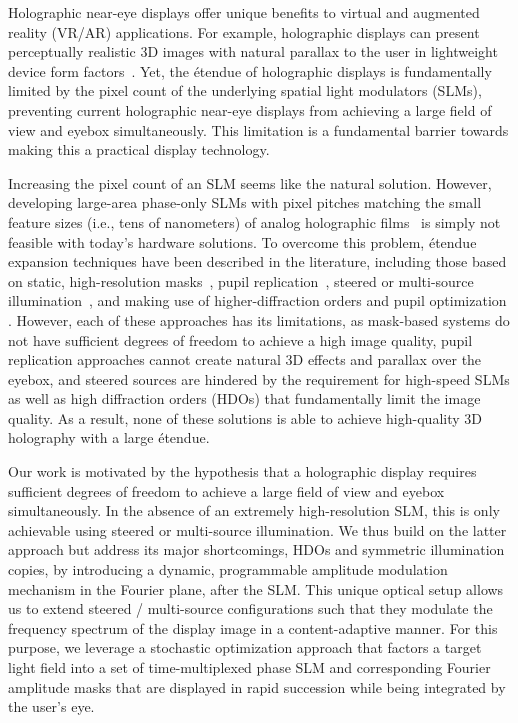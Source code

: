 
Holographic near-eye displays offer unique benefits to virtual and augmented reality (VR/AR) applications. For example, holographic displays can present perceptually realistic 3D images with natural parallax to the user in lightweight device form factors~\cite{maimone2017holo,Kim2022-cd, gopakumar2024ar,jang2024waveguide}. Yet, the \'etendue of holographic displays is fundamentally limited by the pixel count of the underlying spatial light modulators (SLMs), preventing current holographic near-eye displays from achieving a large field of view and eyebox simultaneously. This limitation is a fundamental barrier towards making this a practical display technology. 


Increasing the pixel count of an SLM seems like the natural solution. However, developing large-area phase-only SLMs with pixel pitches matching the small feature sizes (i.e., tens of nanometers) of analog holographic films~\cite{benton2008holographic} is simply not feasible with today's hardware solutions. To overcome this problem, \'etendue expansion techniques have been described in the literature, including those based on static, high-resolution masks~\cite{kuo2020mask, park2019photon,yu2017speckle, buckley2006mask,monin2022mask,tseng2023neural}, pupil replication~\cite{kress2020waveguide}, steered or multi-source illumination~\cite{jang2018hoe,lee2020wide,jo2022binary,lee2022envelope, monin2022tilt}, and making use of higher-diffraction orders and pupil optimization \cite{shi2024ergo, schiffers2023stochastic}. However, each of these approaches has its limitations, as mask-based systems do not have sufficient degrees of freedom to achieve a high image quality, pupil replication approaches cannot create natural 3D effects and parallax over the eyebox, and steered sources are hindered by the requirement for high-speed SLMs as well as high diffraction orders (HDOs) that fundamentally limit the image quality. As a result, none of these solutions is able to achieve high-quality 3D holography with a large \'etendue.


Our work is motivated by the hypothesis that a holographic display requires sufficient degrees of freedom to achieve a large field of view and eyebox simultaneously. In the absence of an extremely high-resolution SLM, this is only achievable using steered or multi-source illumination. We thus build on the latter approach but address its major shortcomings, HDOs and symmetric illumination copies, by introducing a dynamic, programmable amplitude modulation mechanism in the Fourier plane, after the SLM. This unique optical setup allows us to extend steered / multi-source configurations such that they modulate the frequency spectrum of the display image in a content-adaptive manner. For this purpose, we leverage a stochastic optimization approach that factors a target light field into a set of time-multiplexed phase SLM and corresponding Fourier amplitude masks that are displayed in rapid succession while being integrated by the user's eye.


